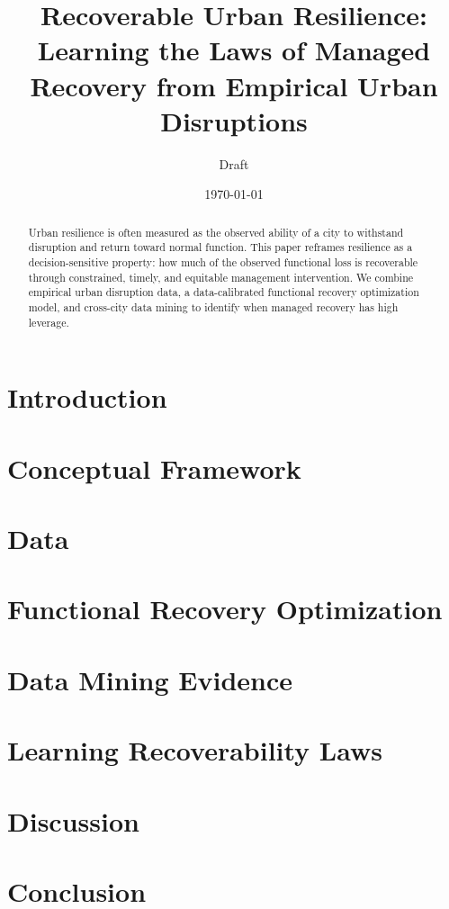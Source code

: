 \documentclass[11pt]{article}
\title{Recoverable Urban Resilience: Learning the Laws of Managed Recovery from Empirical Urban Disruptions}
\author{Draft}
\date{\today}
\begin{document}
\maketitle

\begin{abstract}
Urban resilience is often measured as the observed ability of a city to withstand disruption and return toward normal function. This paper reframes resilience as a decision-sensitive property: how much of the observed functional loss is recoverable through constrained, timely, and equitable management intervention. We combine empirical urban disruption data, a data-calibrated functional recovery optimization model, and cross-city data mining to identify when managed recovery has high leverage.
\end{abstract}

\section{Introduction}


\section{Conceptual Framework}


\section{Data}


\section{Functional Recovery Optimization}


\section{Data Mining Evidence}


\section{Learning Recoverability Laws}


\section{Discussion}


\section{Conclusion}




\end{document}
